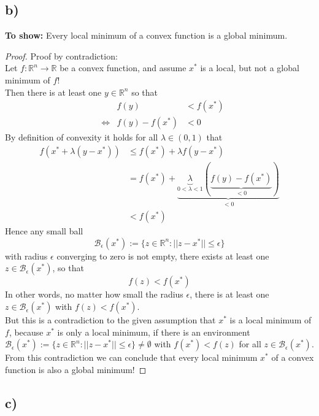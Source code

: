 \documentclass[a4paper]{article}
\begin{document}
    \subsection*{b)}
        \textbf{To show:} Every local minimum of a convex function is a global minimum.
        \begin{proof}
            Proof by contradiction:\\
            Let $f: \mathbb{R}^n \rightarrow \mathbb{R}$ be a convex function, and assume $x^*$ is a local, but not a global minimum of $f$!\\
            Then there is at least one $y \in \mathbb{R}^n$ so that
            \begin{align}
                & & f(y) &< f(x^*)\\
                &\Leftrightarrow & f(y) - f(x^*) &< 0
            \end{align}
            By definition of convexity it holds for all $\lambda \in (0,1)$ that
            \begin{align}
                f(x^* + \lambda (y - x^*)) &\leq f(x^*) + \lambda f(y - x^*)\\
                &= f(x^*) + \underbrace{\underbrace{\lambda}_{0 < \lambda < 1} (\underbrace{f(y) - f(x^*)}_{< 0})}_{< 0}\\
                &< f(x^*)
            \end{align}
            Hence any small ball
            $$\mathcal{B}_{\epsilon}(x^*) := \{z \in \mathbb{R}^n : ||z-x^*|| \leq \epsilon\}$$
            with radius $\epsilon$ converging to zero is not empty, there exists at least one $z \in \mathcal{B}_{\epsilon}(x^*)$, so that
            $$f(z) < f(x^*)$$
            In other words, no matter how small the radius $\epsilon$, there is at least one $z \in \mathcal{B}_{\epsilon}(x^*)$ with $f(z) < f(x^*)$.\\
            But this is a contradiction to the given assumption that $x^*$ is a local minimum of $f$, because $x^*$ is only a local minimum, if there is an environment $\mathcal{B}_{\epsilon}(x^*) := \{z \in \mathbb{R}^n : ||z-x^*|| \leq \epsilon\} \neq \emptyset$ with $f(x^*) < f(z)$ for all $z \in \mathcal{B}_{\epsilon}(x^*)$.\\
            From this contradiction we can conclude that every local minimum $x^*$ of a convex function is also a global minimum!
        \end{proof}
        
        
    \subsection*{c)}
        
    
    
\end{document}
